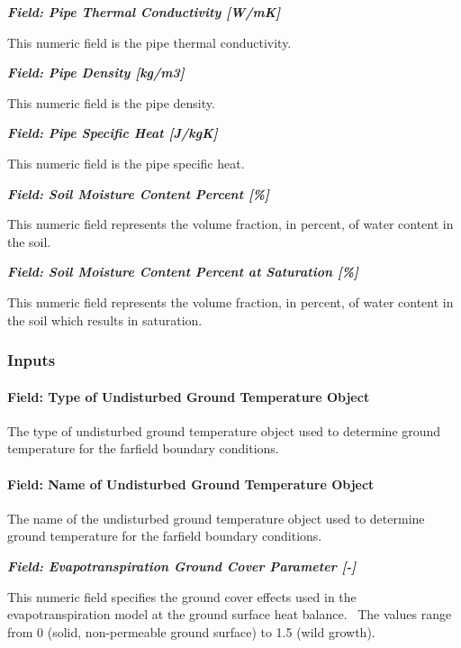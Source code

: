 \textbf{\emph{Field: Pipe Thermal Conductivity {[}W/mK{]}}}

This numeric field is the pipe thermal conductivity.

\textbf{\emph{Field: Pipe Density {[}kg/m3{]}}}

This numeric field is the pipe density.

\textbf{\emph{Field: Pipe Specific Heat {[}J/kgK{]}}}

This numeric field is the pipe specific heat.

\textbf{\emph{Field: Soil Moisture Content Percent {[}\%{]}}}

This numeric field represents the volume fraction, in percent, of water content in the soil.

\textbf{\emph{Field: Soil Moisture Content Percent at Saturation {[}\%{]}}}

This numeric field represents the volume fraction, in percent, of water content in the soil which results in saturation.

\subsubsection{Inputs}\label{inputs-14-002}

\paragraph{Field: Type of Undisturbed Ground Temperature Object}\label{field-type-of-undisturbed-ground-temperature-object-1}

The type of undisturbed ground temperature object used to determine ground temperature for the farfield boundary conditions.

\paragraph{Field: Name of Undisturbed Ground Temperature Object}\label{field-name-of-undisturbed-ground-temperature-object-1}

The name of the undisturbed ground temperature object used to determine ground temperature for the farfield boundary conditions.

\textbf{\emph{Field: Evapotranspiration Ground Cover Parameter {[}-{]}}}

This numeric field specifies the ground cover effects used in the evapotranspiration model at the ground surface heat balance.~ The values range from 0 (solid, non-permeable ground surface) to 1.5 (wild growth).

